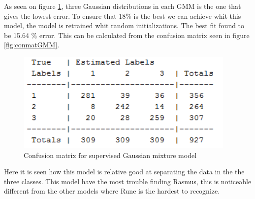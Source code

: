 As seen on figure \ref{fig:fitGMM}, three Gaussian distributions in each GMM is the one that gives the lowest error. To ensure that 18\% is the best we can achieve whit this model, the model is retrained whit random initializations. The best fit found to be 15.64 \% error. This can be calculated from the confusion matrix seen in figure \ref{fig:conmatGMM}. 

\begin{figure}[H]
\centering
\includegraphics[scale=0.7]{billeder/conmatgmm}
\caption{Confusion matrix for supervised Gaussian mixture model }
\label{fig:fitGMM}
\end{figure}

Here it is seen how this model is relative good at separating the data in the  the three classes. This model have the most trouble finding Rasmus, this is noticeable different from the other models where Rune is the hardest to recognize. 

